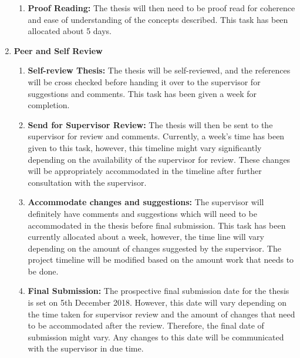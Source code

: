 \documentclass[a4paper,twoside,phd]{BYUPhys}
\begin{document}
\begin{enumerate}
\begin{enumerate}
        \item \textbf{Proof Reading:} The thesis will then need to be proof read for coherence and ease of understanding of the concepts described. This task has been allocated about 5 days.
    \end{enumerate}
    \item \textbf{Peer and Self Review}
    \begin{enumerate}
        \item \textbf{Self-review Thesis:} The thesis will be self-reviewed, and the references will be cross checked before handing it over to the supervisor for suggestions and comments. This task has been given a week for completion.
        \item \textbf{Send for Supervisor Review:} The thesis will then be sent to the supervisor for
        review and comments. Currently, a week’s time has been given to this task, however, this timeline might vary significantly depending on the availability of the supervisor for review. These changes will be appropriately accommodated in the timeline after further consultation with the supervisor.
        \item \textbf{Accommodate changes and suggestions:} The supervisor will definitely have comments and suggestions which will need to be accommodated in the thesis before final submission. This task has been currently allocated about a week, however, the time line will vary depending on the amount of changes suggested by the supervisor. The project timeline will be modified based on the amount work that needs to be done.
        \item \textbf{Final Submission:} The prospective final submission date for the thesis is set on 5th December 2018. However, this date will vary depending on the time taken for supervisor review and the amount of changes that need to be accommodated after the review. Therefore, the final date of submission might vary. Any changes to this date will be communicated with the supervisor in due time.
    \end{enumerate}
\end{enumerate}
\end{document}
